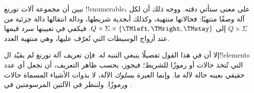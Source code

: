 \documentclass[../../../include/open-logic-section]{subfiles}
\begin{document}

\begin{explain}
نبين أن مجموعة آلات تورنغ !!{enumerable}، على معنى ستأتي دقته.
ووجه ذلك أن لكل آلة وصفًا منتهيًا: فحالاتها منتهية، وكذلك أبجدية
شريطها، ودالة انتقالها دالة جزئية من $Q \times \Sigma$ إلى
$Q \times \Sigma \times \{\TMleft,\TMright,\TMstay\}$. فيكفي في تعيينها
سرد قيمها عند أزواج الوسيطات التي تُعرّف عليها، وهي منتهية العدد.

إلا أن في هذا القول تفصيلًا ينبغي التنبه له. فإن تعريف آلة تورنغ
لم يقيّد ال!!{element}s التي تُتخذ حالات أو رموزًا للشريط؛ فيجوز،
بحسب ظاهر التعريف، أن نجعل أي عدد حقيقي بعينه حالة لآلة ما. وإنما
العبرة ب\emph{سلوك} الآلة، لا بذوات الأشياء المسماة حالات ورموزًا.
ولننظر في الآلتين المرسومتين في .
\begin{figure}
\begin{center}
\\
\end{center}
\end{figure}
\end{explain}
\end{document}
